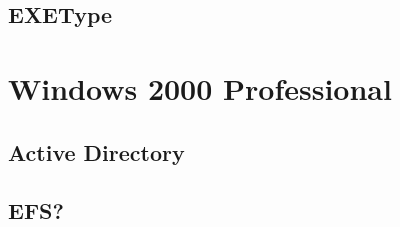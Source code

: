 	\subsection{EXEType}

\section{Windows 2000 Professional}

	\subsection{Active Directory}
	\subsection{EFS?}


